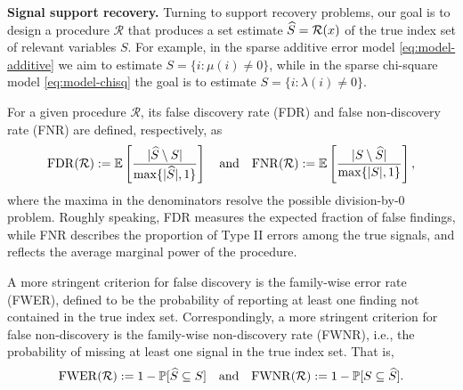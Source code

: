 {\bf Signal support recovery.}
Turning to support recovery problems, our goal is to design a procedure $\mathcal R$ that produces a set estimate $\widehat{S}= {\cal R}(x)$ of the true index set of relevant variables $S$.
For example, in the sparse additive error model \eqref{eq:model-additive} we aim to estimate $S=\{i:\mu(i)\neq 0\}$, while in the sparse chi-square model \eqref{eq:model-chisq} the goal is to estimate $S=\{i:\lambda(i)\neq 0\}$.

For a given procedure $\mathcal{R}$, its {false discovery rate} (FDR) 
and  {false non-discovery rate} (FNR) are defined, respectively, as
\begin{equation} \label{eq:FDR-FNR}
    \mathrm{FDR}(\mathcal{R}) := \E\left[\frac{|\widehat{S}\setminus S|}{\max\{|\widehat{S}|,1\}}\right]
    \quad \text{and} \quad
    \mathrm{FNR}(\mathcal{R}) := \E\left[\frac{|S\setminus \widehat{S}|}{\max\{|{S}|,1\}}\right],
\end{equation}
where the maxima in the denominators resolve the possible division-by-0 problem. 
Roughly speaking, FDR measures the expected fraction of false findings, while FNR describes the proportion of Type II errors among the true signals, and reflects the average marginal power of the procedure.

A more stringent criterion for false discovery is the family-wise error rate (\ac{FWER}), defined to be the probability of 
reporting at least one finding not contained 
in the true index set. Correspondingly, a more stringent criterion for false non-discovery is the family-wise non-discovery rate (\ac{FWNR}), i.e., the probability of missing at least one signal in the true index set. That is,
\begin{equation} \label{eq:FWER-FWNR}
    \mathrm{FWER}(\mathcal{R}) := 1 - \P[\widehat{S} \subseteq S]
    \quad \text{and} \quad
    \mathrm{FWNR}(\mathcal{R}) := 1 - \P[S \subseteq \widehat{S}].
\end{equation}

